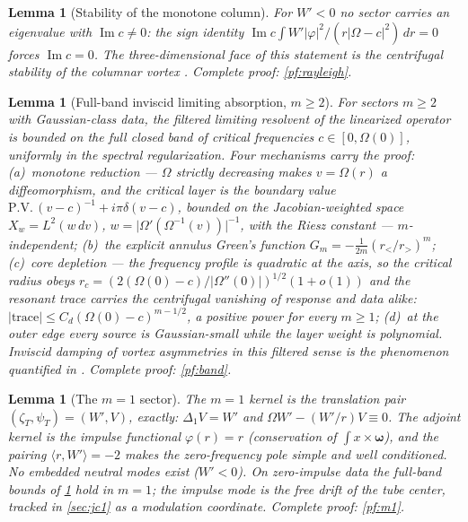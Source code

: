 \documentclass[11pt,letterpaper]{amsart}
\newtheorem{lemma}[theorem]{Lemma}
\theoremstyle{definition}
\theoremstyle{remark}
\newcommand{\vort}{\boldsymbol{\omega}}
\newcommand{\abs}[1]{\lvert #1 \rvert}
\begin{document}
\begin{lemma}[Stability of the monotone column]\label{lem:rayleigh}
For $W'<0$ no sector carries an eigenvalue with $\operatorname{Im}c\neq0$: the sign
identity $\operatorname{Im}c\int W'\abs{\varphi}^2/(r\abs{\Omega-c}^2)\,dr=0$ forces
$\operatorname{Im}c=0$. The three-dimensional face of this statement is the
centrifugal stability of the columnar vortex \cite{GallaySmets2020}. Complete proof:
\cref{pf:rayleigh}.
\end{lemma}

\begin{lemma}[Full-band inviscid limiting absorption, $m\ge2$]\label{lem:band}
For sectors $m\ge2$ with Gaussian-class data, the filtered limiting resolvent of the
linearized operator is bounded on the full closed band of critical frequencies
$c\in[0,\Omega(0)]$, uniformly in the spectral regularization. Four mechanisms carry
the proof: \textup{(a)}~\emph{monotone reduction} --- $\Omega$ strictly decreasing
makes $v=\Omega(r)$ a diffeomorphism, and the critical layer is the boundary value
$\mathrm{P.V.}\,(v-c)^{-1}+i\pi\delta(v-c)$, bounded on the Jacobian-weighted space
$X_w=L^2(w\,dv)$, $w=\abs{\Omega'(\Omega^{-1}(v))}^{-1}$, with the Riesz constant ---
$m$-independent; \textup{(b)}~the explicit annulus Green's function
$G_m=-\tfrac{1}{2m}(r_</r_>)^m$; \textup{(c)}~\emph{core depletion} --- the frequency
profile is quadratic at the axis, so the critical radius obeys
$r_c=(2(\Omega(0)-c)/\abs{\Omega''(0)})^{1/2}(1+o(1))$ and the resonant trace carries
the centrifugal vanishing of response and data alike:
$\abs{\mathrm{trace}}\le C_d(\Omega(0)-c)^{m-1/2}$, a positive power for every
$m\ge1$; \textup{(d)}~at the outer edge every source is Gaussian-small while the layer
weight is polynomial. Inviscid damping of vortex asymmetries in this filtered sense is
the phenomenon quantified in \cite{BCZV2019,Schecter2000}. Complete proof:
\cref{pf:band}.
\end{lemma}

\begin{lemma}[The $m=1$ sector]\label{lem:m1}
The $m=1$ kernel is the translation pair $(\zeta_T,\psi_T)=(W',V)$, exactly:
$\Delta_1V=W'$ and $\Omega W'-(W'/r)V\equiv0$. The adjoint kernel is the impulse
functional $\varphi(r)=r$ (conservation of $\int x\times\vort$), and the pairing
$\langle r,W'\rangle=-2$ makes the zero-frequency pole simple and well conditioned. No
embedded neutral modes exist ($W'<0$). On zero-impulse data the full-band bounds of
\cref{lem:band} hold in $m=1$; the impulse mode is the free drift of the tube center,
tracked in \cref{sec:jc1} as a modulation coordinate. Complete proof: \cref{pf:m1}.
\end{lemma}
\end{document}

